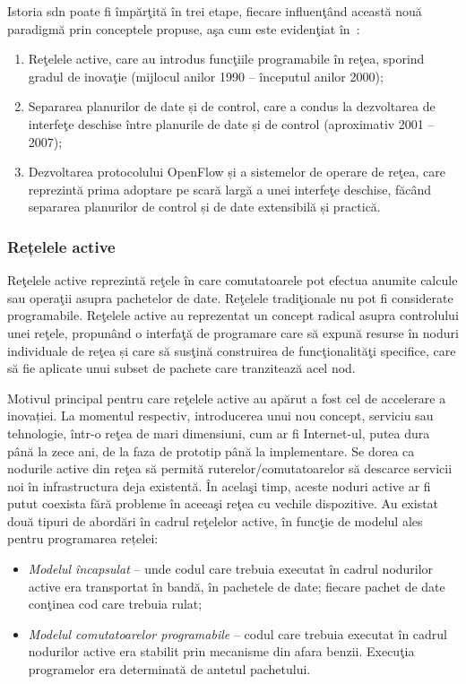 Istoria \gls{sdn} poate fi împărţită în trei etape, fiecare influenţând această nouă paradigmă prin conceptele propuse, aşa cum este evidenţiat în~\cite{feamster2014road}:
\begin{enumerate}
	\item Reţelele active, care au introdus funcţiile programabile în reţea, sporind gradul de inovaţie (mijlocul anilor 1990 – începutul anilor 2000);
	\item Separarea planurilor de date și de control, care a condus la dezvoltarea de interfeţe deschise între planurile de date și de control (aproximativ 2001 – 2007);
	\item Dezvoltarea protocolului OpenFlow și a sistemelor de operare de reţea, care reprezintă prima adoptare pe scară largă a unei interfeţe deschise, făcând separarea planurilor de control și de date extensibilă și practică.
\end{enumerate}

\subsubsection{Rețelele active}

Reţelele active reprezintă reţele în care comutatoarele pot efectua anumite calcule sau operaţii asupra pachetelor de date. Reţelele tradiţionale nu pot fi considerate programabile. Reţelele active au reprezentat un concept radical asupra controlului unei reţele, propunând o interfaţă de programare care să expună resurse în noduri individuale de reţea și care să susţină construirea de funcţionalităţi specifice, care să fie aplicate unui subset de pachete care tranzitează acel nod.

Motivul principal pentru care reţelele active au apărut a fost cel de accelerare a inovației. La momentul respectiv, introducerea unui nou concept, serviciu sau tehnologie, într-o reţea de mari dimensiuni, cum ar fi Internet-ul, putea dura până la zece ani, de la faza de prototip până la implementare. Se dorea ca nodurile active din reţea să permită ruterelor/comutatoarelor să descarce servicii noi în infrastructura deja existentă. În acelaşi timp, aceste noduri active ar fi putut coexista fără probleme în aceeaşi reţea cu vechile dispozitive.
Au existat două tipuri de abordări în cadrul reţelelor active, în funcţie de modelul ales pentru programarea rețelei:
\begin{itemize}
\item \textit{Modelul încapsulat} – unde codul care trebuia executat în cadrul nodurilor active era transportat în bandă, în pachetele de date; fiecare pachet de date conţinea cod care trebuia rulat;
\item \textit{Modelul comutatoarelor programabile} – codul care trebuia executat în cadrul nodurilor active era stabilit prin mecanisme din afara benzii. Execuţia programelor era determinată de antetul pachetului.
\end{itemize}

